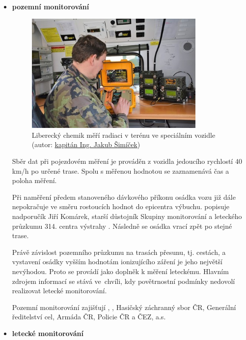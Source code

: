 \begin{itemize}
		
\item \textbf{pozemní monitorování}
	
\begin{figure}[H]
    \centering
      \includegraphics[width=250pt]{./pictures/02_mereni-radiace-v-terenu-z-vozidla_2.jpg}
      \caption[Liberecký chemik měří radiaci v terénu ve speciálním vozidle]{Liberecký chemik měří radiaci v terénu ve speciálním vozidle
      (autor: \href{http://www.acr.army.cz/informacni-servis/zpravodajstvi/armadni-radiacni-monitorovaci-site-nacvicoval-zasah-pri-radiaci-131355/}{kapitán Ing. Jakub Šimíček})}
      \label{fig:pozemni}
\end{figure}
	
Sběr dat při pojezdovém měření je prováděn z vozidla jedoucího
rychlostí 40 km/h po určené trase. Spolu s měřenou hodnotou se
zaznamenává čas a poloha měření.
	
Při naměření předem stanoveného dávkového příkonu osádka vozu již dále
nepokra\-čuje ve směru rostoucích hodnot do epicentra
výbuchu. 
popi\-suje nadporučík Jiří Komárek, starší důstojník Skupiny
monitorování a leteckého průzkumu 314. centra výstrahy
. Následně se osádka vrací zpět po stejné trase.
	
Právě závislost pozemního průzkumu na trasách přesunu, tj. cestách, a
vystavení osádky vyšším hodnotám ionizujícího záření je jeho největší
nevýhodou. Proto se provádí jako doplněk k měření leteckému. Hlavním
zdrojem informací se stává ve~chvíli, kdy povětrnostní podmínky
nedovolí realizovat letecké monitorování.
	
Pozemní monitorování zajišťují , , Hasičský
záchranný sbor ČR, Gene\-rální ředitelství cel, Armáda ČR, Policie ČR a
ČEZ, a.s.
	
\item \textbf{letecké monitorování}
	

\end{itemize}

